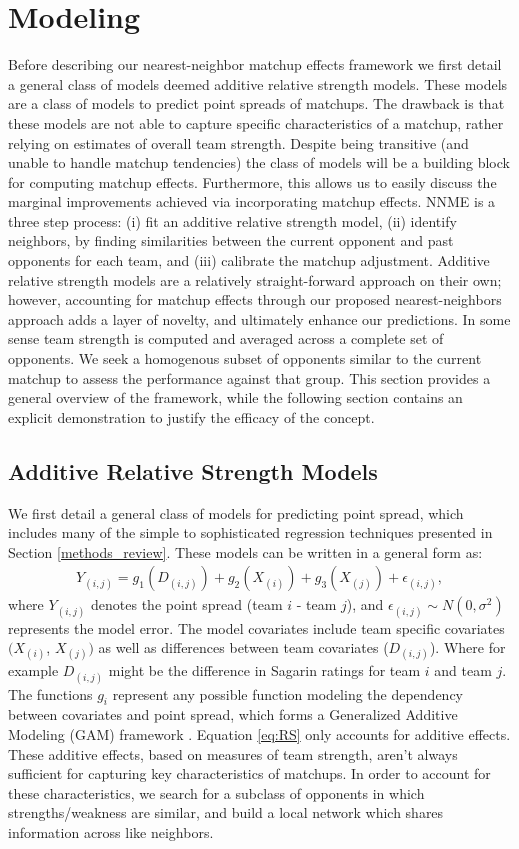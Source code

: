 \documentclass[letterpaper,12pt]{article}
\begin{document}
\section{Modeling\label{sec:NNME}}
Before describing our nearest-neighbor matchup effects framework we first detail a general class of models deemed additive relative strength models. These models are a class of models to predict point spreads of matchups. The drawback is that these models are not able to capture specific characteristics of a matchup, rather relying on estimates of overall team strength. Despite being transitive (and unable to handle matchup tendencies) the class of models will be a building block for computing matchup effects. Furthermore, this allows us to easily discuss the marginal improvements achieved via incorporating matchup effects. NNME is a three step process: (i) fit an additive relative strength model, (ii) identify neighbors, by finding similarities between the current opponent and past opponents for each team, and (iii) calibrate the matchup adjustment. Additive relative strength models are a relatively straight-forward approach on their own; however, accounting for matchup effects through our proposed nearest-neighbors approach adds a layer of novelty, and ultimately enhance our predictions. In some sense team strength is computed and averaged across a complete set of opponents. We seek a homogenous subset of opponents similar to the current matchup to assess the performance against that group. This section provides a general overview of the framework, while the following section contains an explicit demonstration to justify the efficacy of the concept.

\subsection{Additive Relative Strength Models \label{sec:AS}}
We first detail a general class of models for predicting point spread, which includes many of the simple to sophisticated regression techniques presented in Section \ref{methods_review}. These models can be written in a general form as:
\begin{eqnarray}
Y_{(i,j)} = g_1(D_{(i,j)}) + g_2(X_{(i)}) + g_3(X_{(j)}) +  \epsilon_{(i,j)},
\label{eq:RS}
\end{eqnarray}
where $Y_{(i,j)}$ denotes the point spread (team $i$ - team $j$), and $\epsilon_{(i,j)}\sim N(0,\sigma^2)$ represents the model error. The model covariates include team specific covariates $(X_{(i)}$, $X_{(j)})$ as well as differences between team covariates ($D_{(i,j)}$). Where for example $D_{(i,j)}$ might be the difference in Sagarin ratings for team $i$ and team $j$. The functions $g_i$ represent any possible function modeling the dependency between covariates and point spread, which forms a Generalized Additive Modeling (GAM) framework \citep{GAMs}. Equation \ref{eq:RS} only accounts for additive effects. These additive effects, based on measures of team strength, aren't always sufficient for capturing key characteristics of matchups. In order to account for these characteristics, we search for a subclass of opponents in which strengths/weakness are similar, and build a local network which shares information across like neighbors.  
\end{document}
